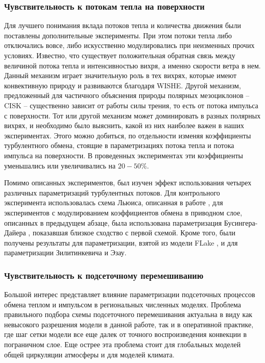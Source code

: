 \documentclass[12pt,a4paper]{report}
\begin{document}
\subsubsection{Чувствительность к потокам тепла на поверхности}
Для лучшего понимания вклада потоков тепла и количества движения были поставлены дополнительные эксперименты. При этом потоки тепла либо отключались вовсе, либо искусственно модулировались при неизменных прочих условиях. 
Известно, что существует положительная обратная связь между величиной потока тепла и интенсивностью вихря, а именно скорости ветра в нем. Данный механизм играет значительную роль в тех вихрях, которые имеют конвективную природу и развиваются благодаря WISHE. Другой механизм, предложенный  для частичного объяснения природы полярных мезоциклонов -- CISK -- существенно зависит от работы силы трения, то есть от потока импульса с поверхности. Тот или другой механизм может доминировать в разных полярных вихрях, и необходимо было выяснить, какой из них наиболее важен в наших экспериментах. Этого можно добиться, по отдельности изменяя коэффициенты турбулентного обмена, стоящие в параметризациях потока тепла и потока импульса на поверхности. В проведенных экспериментах эти коэффициенты уменьшались или увеличивались на $20-50\%$.

Помимо описанных экспериментов, был изучен эффект использования четырех различных параметризаций турбулентных потоков. Для контрольного эксперимента использовалась схема Льюиса, описанная в работе \citep{Louis1979}, для экспериментов с модулированием коэффициентов обмена в приводном слое, описанных в предыдущем абзаце, была использована параметризация Бусингера-Дайера \citep{MirandaPhD}, показавшая близкое сходство с первой схемой. Кроме того, были получены результаты для параметризации, взятой из модели FLake \citep{Mironov2006}, и для параметризации Зилитинкевича и Эзау.

\subsubsection{Чувствительность к подсеточному перемешиванию}
Большой интерес представляет влияние параметризации подсеточных процессов обмена теплом и импульсом в региональных численных моделях. Проблема правильного подбора схемы подсеточного перемешивания актуальна в виду как невысокого разрешения модели в данной работе, так и в оперативной практике, где шаг сетки модели все еще далек от точного воспроизведения конвекции в пограничном слое. Еще острее эта проблема стоит для глобальных моделей общей циркуляции атмосферы и для моделей климата. 
\end{document}
